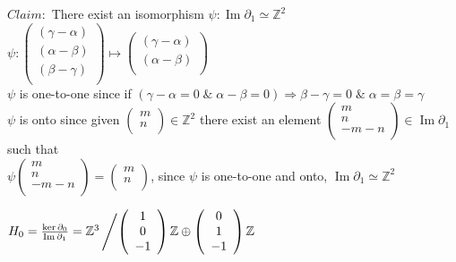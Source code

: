 \documentclass[11pt,a4paper]{report}
\DeclareMathOperator{\Ima}{Im}
\begin{document}
$Claim: $ There exist an isomorphism $\psi: \Ima\partial_1 \simeq \mathbb{Z}^2$\\ 
$\psi: \left(\begin{array}{c}
                    ( \gamma - \alpha )\\
                    (\alpha - \beta)\\
                    (\beta - \gamma)\\
            \end{array} \right) \mapsto
            \left(\begin{array}{c}
                    ( \gamma - \alpha )\\
                    (\alpha - \beta)\\
            \end{array} \right)$ \\
$\psi $ is one-to-one since if $ ( \gamma - \alpha  = 0 \; \& \; \alpha - \beta = 0) \Rightarrow \beta - \gamma = 0  \; \& \; \alpha = \beta = \gamma $ \\
$\psi $ is onto since given $\left(\begin{array}{c}
                    m\\
                    n\\
            \end{array} \right) \in \mathbb{Z}^2$ 
        there exist an element $\left(\begin{array}{c}
                    m\\
                    n\\
                    -m-n\\
            \end{array} \right) \in \Ima\partial_1 $ such that \\
$\psi \left(\begin{array}{c}
                    m\\
                    n\\
                    -m-n\\
            \end{array} \right) = 
      \left(\begin{array}{c}
                    m\\
                    n\\
            \end{array} \right)$, since $\psi$ is one-to-one and onto, $\Ima\partial_1 \simeq \mathbb{Z}^2$ 

$H_0 = \frac{\ker\partial_0}{\Ima\partial_1} = \mathbb{Z}^{3} \left/ {
    \left(\begin{array}{c}
                    1\\
                    0\\
                    -1\\
            \end{array} \right)\mathbb{Z} \oplus
    \left(\begin{array}{c}
                    0\\
                    1\\
                    -1\\
            \end{array} \right)\mathbb{Z}} \right.$ \\
\end{document}
